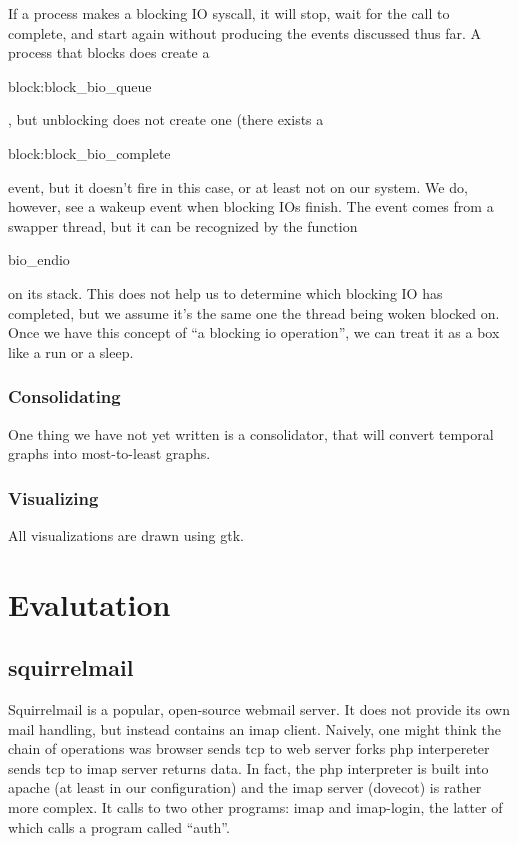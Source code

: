 \documentclass[10pt]{article}
\begin{document}
If a process makes a blocking IO syscall, it will stop, wait for the call to complete, and start again without producing the events discussed thus far.  A process that blocks does create a \begin{tt}block:block\_bio\_queue\end{tt}, but unblocking does not create one (there exists a \begin{tt}block:block\_bio\_complete\end{tt} event, but it doesn't fire in this case, or at least not on our system.  We do, however, see a wakeup event when blocking IOs finish.  The event comes from a swapper thread, but it can be recognized by the function \begin{tt}bio\_endio\end{tt} on its stack.  This does not help us to determine which blocking IO has completed, but we assume it's the same one the thread being woken blocked on.  Once we have this concept of ``a blocking io operation'', we can treat it as a box like a run or a sleep.

\subsubsection{Consolidating}

One thing we have not yet written is a consolidator, that will convert temporal graphs into most-to-least graphs.

\subsubsection{Visualizing}

All visualizations are drawn using gtk.

\section{Evalutation}
\subsection{squirrelmail}

Squirrelmail is a popular, open-source webmail server.  It does not provide its own mail handling, but instead contains an imap client.  Naively, one might think the chain of operations was browser sends tcp to web server forks php interpereter sends tcp to imap server returns data.  In fact, the php interpreter is built into apache (at least in our configuration) and the imap server (dovecot) is rather more complex.  It calls to two other programs: imap and imap-login, the latter of which calls a program called ``auth''.
\end{document}
